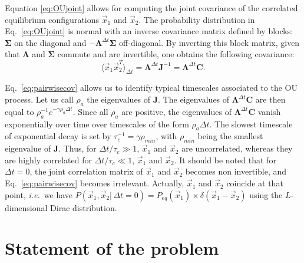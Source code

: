 \documentclass[preprint,amsmath,amssymb,superscriptaddress,showpacs,pre]{revtex4-1}
\newcommand{\ie}{\emph{i.e.}}
\def\vx{\vec x}
\newcommand{\Lam}{\bm{\Lambda}}
\newcommand{\Sig}{\bm{\Sigma}}
\begin{document}
Equation \eqref{eq:OUjoint} allows for computing the joint covariance of the correlated equilibrium configurations $\vx_1$ and $\vx_2$. 
The probability distribution in Eq.~\eqref{eq:OUjoint} is normal with an inverse covariance matrix defined by blocks: $\Sig$ on the diagonal and $-\Lam^{\Delta t}\Sig$ off-diagonal. 
By inverting this block matrix, given that $\Lam$ and $\Sig$ commute and are invertible, one obtains the following covariance: 
\begin{equation}
	\langle \vx_1\vx_2^T \rangle_{\Delta t} = \Lam^{\Delta t}\bm{J}^{-1} = \Lam^{\Delta t}\bm{C}. 
	\label{eq:pairwisecov}
\end{equation}


Eq.~\eqref{eq:pairwisecov} allows us to identify typical timescales associated to the OU process. 
Let us call $\rho_a$ the eigenvalues of $\bm{J}$. 
The eigenvalues of $\Lam^{\Delta t}\bm{C}$ are then equal to $\rho_a^{-1}e^{-\gamma\rho_a\Delta t}$. 
Since all $\rho_a$ are positive, the eigenvalues of $\Lam^{\Delta t}\bm{C}$ vanish exponentially over time over timescales of the form $\rho_a\Delta t$. 
The slowest timescale of exponential decay is set by $\tau_c^{-1} = \gamma\rho_{min}$, with $\rho_{min}$ being the smallest eigenvalue of $\bm{J}$. 
Thus, for $\Delta t / \tau_c \gg 1$, $\vx_1$ and $\vx_2$ are uncorrelated, whereas they are highly correlated for $\Delta t / \tau_c \ll 1$, $\vx_1$ and $\vx_2$.
It should be noted that for $\Delta t = 0$, the joint correlation matrix of $\vx_1$ and $\vx_2$ becomes non invertible, and Eq.~\eqref{eq:pairwisecov} becomes irrelevant. Actually, $\vx_1$ and $\vx_2$ coincide at that point, \ie~we have $P(\vx_1,\vx_2|\,\Delta t=0) = P_{eq}(\vx_1) \times \delta(\vx_1 - \vx_2)$ using the $L$-dimensional Dirac distribution.







\section{Statement of the problem}
\label{sec:statement_of_the_problem}
\end{document}
